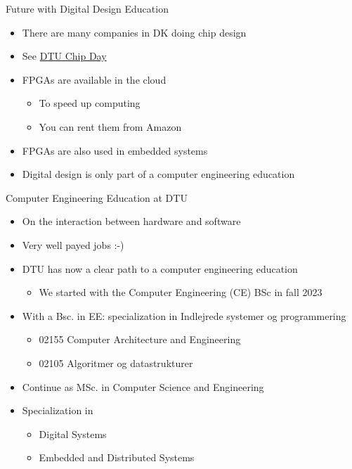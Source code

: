 \begin{frame}[fragile]{Future with Digital Design Education}
\begin{itemize}
\item There are many companies in DK doing chip design
\item See \href{https://chipday.dk/}{DTU Chip Day}
\item FPGAs are available in the cloud
\begin{itemize}
\item To speed up computing
\item You can rent them from Amazon
\end{itemize}
\item FPGAs are also used in embedded systems
\item Digital design is only part of a computer engineering education
\end{itemize}
\end{frame}



\begin{frame}[fragile]{Computer Engineering Education at DTU}
\begin{itemize}
\item On the interaction between hardware and software
\item Very well payed jobs :-)
\item DTU has now a clear path to a computer engineering education
\begin{itemize}
\item We started with the Computer Engineering (CE) BSc in fall 2023
\end{itemize}
\item With a Bsc. in EE: specialization in Indlejrede systemer og programmering
\begin{itemize}
\item 02155 Computer Architecture and Engineering
\item 02105 Algoritmer og datastrukturer
\end{itemize}
\item Continue as MSc. in Computer Science and Engineering
\item Specialization in
\begin{itemize}
\item Digital Systems
\item Embedded and Distributed Systems
\end{itemize}
\end{itemize}
\end{frame}

